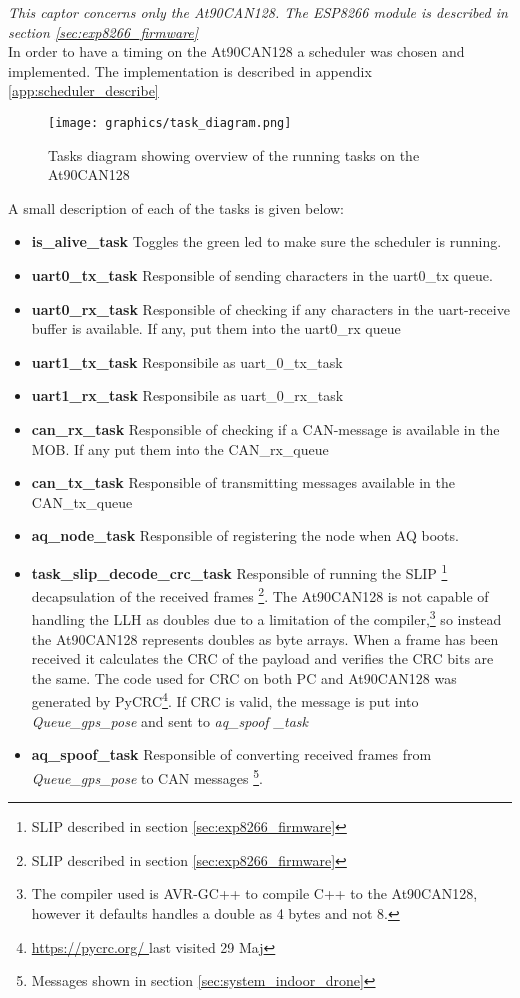 \textit{This captor concerns only the At90CAN128.  The ESP8266 module is described in section \ref{sec:exp8266_firmware}} \\
In order to have a timing on the At90CAN128 a scheduler was chosen and implemented.
The implementation is described in appendix \ref{app:scheduler_describe}
\begin{figure}[H]
    \center
    \texttt{[image: graphics/task\_diagram.png]}
  \caption{Tasks diagram showing overview of the running tasks on the At90CAN128}
    \label{fig:task_diagram_atmega}
\end{figure}
A small description of each of the tasks is given below:
\begin{itemize}
\item \textbf{is\_alive\_task} Toggles the green led to make sure the scheduler is running.
\item \textbf{uart0\_tx\_task} Responsible of sending characters in the uart0\_tx queue.
\item \textbf{uart0\_rx\_task} Responsible of checking if any characters in the uart-receive buffer is available. If any, put them into the uart0\_rx queue
\item \textbf{uart1\_tx\_task} Responsibile as uart\_0\_tx\_task
\item \textbf{uart1\_rx\_task} Responsibile as uart\_0\_rx\_task
\item \textbf{can\_rx\_task} Responsible of checking if a CAN-message is available in the MOB. If any put them into the CAN\_rx\_queue
\item \textbf{can\_tx\_task} Responsible of transmitting messages available in the CAN\_tx\_queue
\item \textbf{aq\_node\_task} Responsible of registering the node when AQ boots.
\item \textbf{task\_slip\_decode\_crc\_task} Responsible of running the SLIP \footnote{SLIP described in section \ref{sec:exp8266_firmware}} decapsulation of the received frames \footnote{SLIP described in section \ref{sec:exp8266_firmware}}. The At90CAN128 is not capable of handling the \ac{LLH} as doubles due to a limitation of the compiler,\footnote{The compiler used is AVR-GC++ to compile C++ to the At90CAN128, however it defaults handles a double as 4 bytes and not 8.} so instead the At90CAN128 represents doubles as byte arrays.
When a frame has been received it calculates the CRC of the payload and verifies the CRC bits are the same. The code used for CRC on both PC and At90CAN128 was generated by PyCRC\footnote{\url{https://pycrc.org/ }last visited 29 Maj}.
If CRC is valid, the message is put into \textit{Queue\_gps\_pose} and sent to \textit{aq\_spoof \_task}
\item \textbf{ aq\_spoof\_task} Responsible of converting  received frames from \textit{Queue\_gps\_pose} to CAN messages \footnote{Messages shown in section \ref{sec:system_indoor_drone}}.
\end{itemize}

